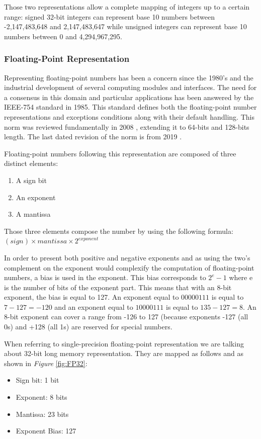 Those two representations allow a complete mapping of integers up to a certain range: signed 32-bit integers can represent base 10 numbers between -2,147,483,648 and 2,147,483,647 while unsigned integers can represent base 10 numbers between 0 and 4,294,967,295.

\subsubsection{Floating-Point Representation}

Representing floating-point numbers has been a concern since the 1980's and the industrial development of several computing modules and interfaces. The need for a consensus in this domain and particular applications has been answered by the IEEE-754 standard \cite{Ieee754_1985} in 1985. This standard defines both the floating-point number representations and exceptions conditions along with their default handling. This norm was reviewed fundamentally in 2008 \cite{Ieee754_2008}, extending it to 64-bits and 128-bits length. The last dated revision of the norm is from 2019 \cite{Ieee754_2019}.

Floating-point numbers following this representation are composed of three distinct elements:
\begin{enumerate}
  \item A sign bit
  \item An exponent
  \item A mantissa
\end{enumerate}

Those three elements compose the number by using the following formula: $(\mathit{sign}) \times \mathit{mantissa} \times 2^{\mathit{exponent}}$

In order to present both positive and negative exponents and as using the two's complement on the exponent would complexify the computation of floating-point numbers, a bias is used in the exponent. This bias corresponds to $2^e - 1$ where e is the number of bits of the exponent part. This means that with an 8-bit exponent, the bias is equal to 127. An exponent equal to $00000111$ is equal to $7 - 127 = -120$ and an exponent equal to $10000111$ is equal to $135 - 127 = 8$. An 8-bit exponent can cover a range from -126 to 127 (because exponents -127 (all 0s) and +128 (all 1s) are reserved for special numbers.

When referring to single-precision floating-point representation we are talking about 32-bit long memory representation. They are mapped as follows and as shown in \emph{Figure} \ref{fig:FP32}:
\begin{itemize}
  \item Sign bit: 1 bit
  \item Exponent: 8 bits
  \item Mantissa: 23 bits
  \item Exponent Bias: 127
\end{itemize}

